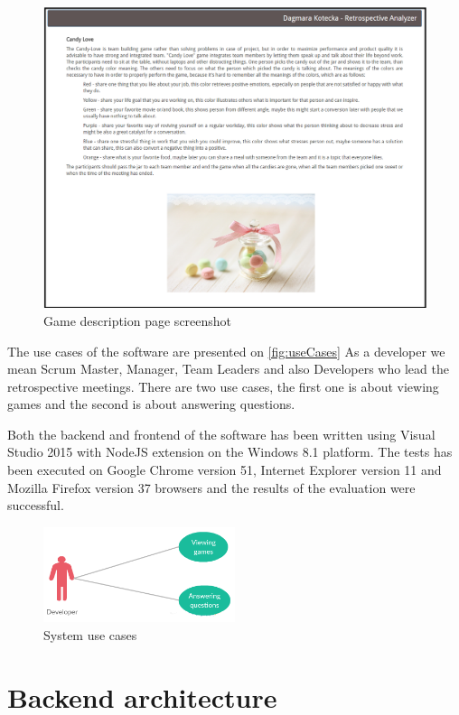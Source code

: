 \begin{figure}[h]
\caption{Game description page screenshot}
\label{fig:gameDescPage}
\centering
\includegraphics[width=1\textwidth]{screenshots/gameDesc.png}
\end{figure}

The use cases of the software are presented on \autoref{fig:useCases} As a developer we mean Scrum Master, Manager, Team Leaders and also Developers who lead the retrospective meetings. There are two use cases, the first one is about viewing games and the second is about answering questions.

Both the backend and frontend of the software has been written using Visual Studio 2015 with NodeJS extension on the Windows 8.1 platform. The tests has been executed on Google Chrome version 51, Internet Explorer version 11 and Mozilla Firefox version 37 browsers and the results of the evaluation were successful.

\begin{figure}[h]
\caption{System use cases}
\label{fig:useCases}
\centering
\includegraphics[width=0.5\textwidth]{img/useCases}
\end{figure}

\section{Backend architecture}

